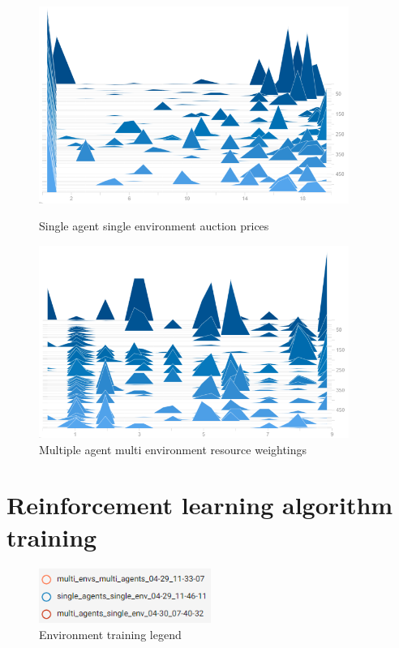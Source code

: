 \begin{figure}
    \centering
    \begin{minipage}{0.45\textwidth}
        \centering
        \includegraphics[width=0.9\textwidth]{figures/env_training_fig/single_agent_single_env_auction_price.png}
        \caption{Single agent single environment auction prices}
        \label{fig:single_agent_single_env_auction_prices}
    \end{minipage}\hfill
    \begin{minipage}{0.45\textwidth}
        \centering
        \includegraphics[width=0.9\textwidth]{figures/env_training_fig/single_agent_single_env_weightings.png}
        \caption{Multiple agent multi environment resource weightings}
        \label{fig:single_agent_single_env_resource_weightings}
    \end{minipage}
\end{figure}

\section{Reinforcement learning algorithm training}\label{sec:reinforcement-learning-algorithm-training}
\begin{figure}
    \includegraphics[width=0.5\textwidth]{figures/env_training_fig/env_training_legend.png}
    \caption{Environment training legend}
    \label{fig:algo-training-legend}
\end{figure}

